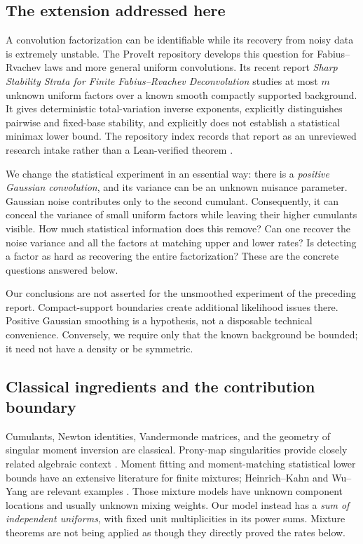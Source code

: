 \documentclass[11pt,a4paper]{article}
\numberwithin{equation}{section}
\theoremstyle{definition}
\theoremstyle{remark}
\begin{document}
\subsection{The extension addressed here}
A convolution factorization can be identifiable while its recovery from noisy
data is extremely unstable. The ProveIt repository develops this question for
Fabius--Rvachev laws and more general uniform convolutions. Its recent report
\emph{Sharp Stability Strata for Finite Fabius--Rvachev Deconvolution}
\cite{RepoFinite} studies at most $m$ unknown uniform factors over a known smooth
compactly supported background. It gives deterministic total-variation inverse
exponents, explicitly distinguishes pairwise and fixed-base stability, and
explicitly does not establish a statistical minimax lower bound. The repository
index records that report as an unreviewed research intake rather than a
Lean-verified theorem \cite{RepoIndex}.

We change the statistical experiment in an essential way: there is a
\emph{positive Gaussian convolution}, and its variance can be an unknown
nuisance parameter. Gaussian noise contributes only to the second cumulant.
Consequently, it can conceal the variance of small uniform factors while
leaving their higher cumulants visible. How much statistical information does
this remove? Can one recover the noise variance and all the factors at matching
upper and lower rates? Is detecting a factor as hard as recovering the entire
factorization? These are the concrete questions answered below.

Our conclusions are not asserted for the unsmoothed experiment of the preceding
report. Compact-support boundaries create additional likelihood issues there.
Positive Gaussian smoothing is a hypothesis, not a disposable technical
convenience. Conversely, we require only that the known background be bounded;
it need not have a density or be symmetric.

\subsection{Classical ingredients and the contribution boundary}
Cumulants, Newton identities, Vandermonde matrices, and the geometry of singular
moment inversion are classical. Prony-map singularities provide closely related
algebraic context \cite{BatenkovYomdin}. Moment fitting and moment-matching
statistical lower bounds have an extensive literature for finite mixtures;
Heinrich--Kahn and Wu--Yang are relevant examples \cite{HeinrichKahn,WuYang}.
Those mixture models have unknown component locations and usually unknown
mixing weights. Our model instead has a \emph{sum of independent uniforms},
with fixed unit multiplicities in its power sums. Mixture theorems are not
being applied as though they directly proved the rates below.
\end{document}

